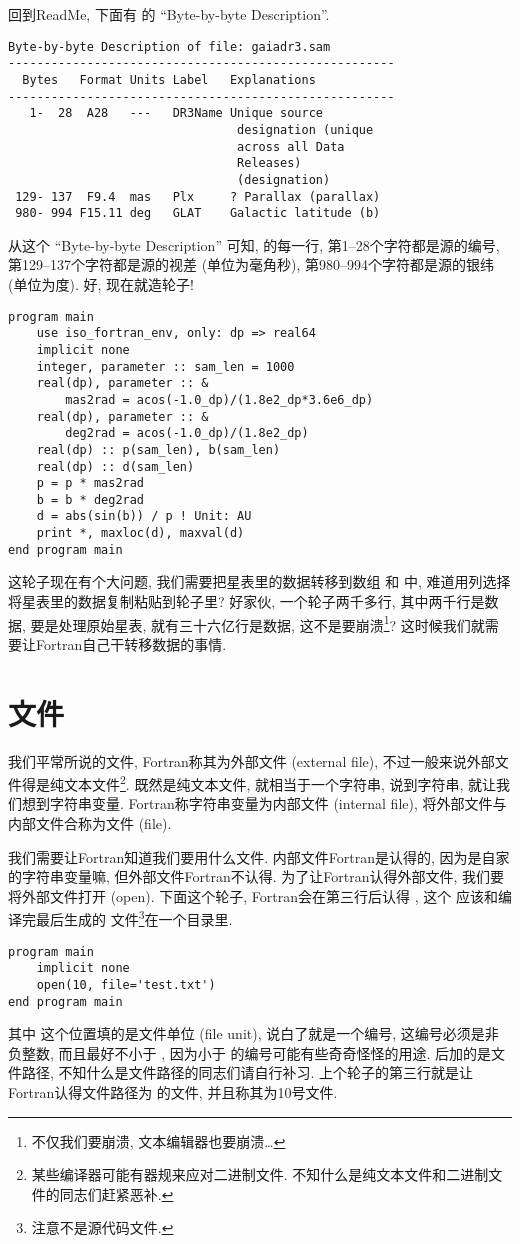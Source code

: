 回到ReadMe, 下面有   的 ``Byte-by-byte Description''. 
\begin{lstlisting}
Byte-by-byte Description of file: gaiadr3.sam 
------------------------------------------------------
  Bytes   Format Units Label   Explanations
------------------------------------------------------
   1-  28  A28   ---   DR3Name Unique source
                                designation (unique
                                across all Data
                                Releases)
                                (designation)
 129- 137  F9.4  mas   Plx     ? Parallax (parallax)
 980- 994 F15.11 deg   GLAT    Galactic latitude (b)
\end{lstlisting}
从这个 ``Byte-by-byte Description'' 可知,  的每一行, 第1--28个字符都是源的编号, 第129--137个字符都是源的视差 (单位为毫角秒), 第980--994个字符都是源的银纬 (单位为度). 好, 现在就造轮子!\label{gaiadr3.sam}
\begin{lstlisting}
program main
    use iso_fortran_env, only: dp => real64
    implicit none
    integer, parameter :: sam_len = 1000
    real(dp), parameter :: &
        mas2rad = acos(-1.0_dp)/(1.8e2_dp*3.6e6_dp)
    real(dp), parameter :: &
        deg2rad = acos(-1.0_dp)/(1.8e2_dp)
    real(dp) :: p(sam_len), b(sam_len)
    real(dp) :: d(sam_len)
    p = p * mas2rad
    b = b * deg2rad
    d = abs(sin(b)) / p ! Unit: AU
    print *, maxloc(d), maxval(d)
end program main
\end{lstlisting}
这轮子现在有个大问题, 我们需要把星表里的数据转移到数组  和  中, 难道用列选择将星表里的数据复制粘贴到轮子里? 好家伙, 一个轮子两千多行, 其中两千行是数据, 要是处理原始星表, 就有三十六亿行是数据, 这不是要崩溃\footnote{不仅我们要崩溃, 文本编辑器也要崩溃\dots{}}? 这时候我们就需要让Fortran自己干转移数据的事情. 

\section{文件}

我们平常所说的文件, Fortran称其为外部文件 (external file), 不过一般来说外部文件得是纯文本文件\footnote{某些编译器可能有器规来应对二进制文件. 不知什么是纯文本文件和二进制文件的同志们赶紧恶补.}. 既然是纯文本文件, 就相当于一个字符串, 说到字符串, 就让我们想到字符串变量. Fortran称字符串变量为内部文件 (internal file), 将外部文件与内部文件合称为文件 (file). 

我们需要让Fortran知道我们要用什么文件. 内部文件Fortran是认得的, 因为是自家的字符串变量嘛, 但外部文件Fortran不认得. 为了让Fortran认得外部文件, 我们要将外部文件打开 (open). 下面这个轮子, Fortran会在第三行后认得 , 这个   应该和编译完最后生成的  文件\footnote{注意不是源代码文件.}在一个目录里. 
\begin{lstlisting}
program main
    implicit none
    open(10, file='test.txt')
end program main
\end{lstlisting}
其中  这个位置填的是文件单位 (file unit), 说白了就是一个编号, 这编号必须是非负整数, 而且最好不小于 , 因为小于  的编号可能有些奇奇怪怪的用途.    后加的是文件路径, 不知什么是文件路径的同志们请自行补习. 上个轮子的第三行就是让Fortran认得文件路径为   的文件, 并且称其为10号文件. 

